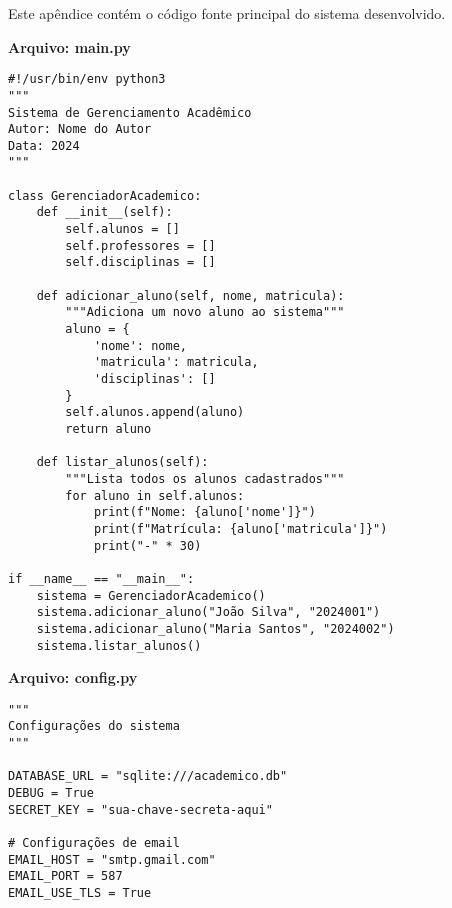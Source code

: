 
Este apêndice contém o código fonte principal do sistema desenvolvido.

\textbf{Arquivo: main.py}

\begin{verbatim}
#!/usr/bin/env python3
"""
Sistema de Gerenciamento Acadêmico
Autor: Nome do Autor
Data: 2024
"""

class GerenciadorAcademico:
    def __init__(self):
        self.alunos = []
        self.professores = []
        self.disciplinas = []
    
    def adicionar_aluno(self, nome, matricula):
        """Adiciona um novo aluno ao sistema"""
        aluno = {
            'nome': nome,
            'matricula': matricula,
            'disciplinas': []
        }
        self.alunos.append(aluno)
        return aluno
    
    def listar_alunos(self):
        """Lista todos os alunos cadastrados"""
        for aluno in self.alunos:
            print(f"Nome: {aluno['nome']}")
            print(f"Matrícula: {aluno['matricula']}")
            print("-" * 30)

if __name__ == "__main__":
    sistema = GerenciadorAcademico()
    sistema.adicionar_aluno("João Silva", "2024001")
    sistema.adicionar_aluno("Maria Santos", "2024002")
    sistema.listar_alunos()
\end{verbatim}

\textbf{Arquivo: config.py}

\begin{verbatim}
"""
Configurações do sistema
"""

DATABASE_URL = "sqlite:///academico.db"
DEBUG = True
SECRET_KEY = "sua-chave-secreta-aqui"

# Configurações de email
EMAIL_HOST = "smtp.gmail.com"
EMAIL_PORT = 587
EMAIL_USE_TLS = True
\end{verbatim}

